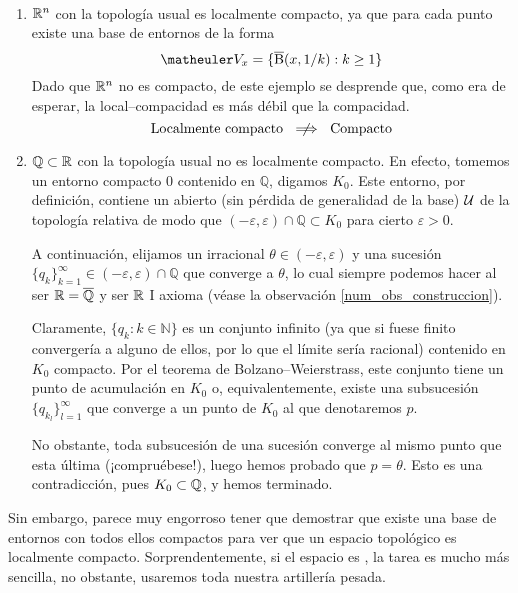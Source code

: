 \begin{exa}\
	\begin{enumerate}
		\item $\mathbb{R}^n$ con la topología usual es localmente compacto, ya que para cada punto existe una base de entornos de la forma
		\[\Va{x}=\{\adher{\bola}(x,1/k):k\geq 1\}\]
		Dado que $\mathbb{R}^n$ no es compacto, de este ejemplo se desprende que, como era de esperar, la local--compacidad es más débil que la compacidad.
		\[\text{Localmente compacto }\centernot\implies \text{ Compacto}\]
		
		\item $\mathbb{Q}\subset\mathbb{R}$ con la topología usual no es localmente compacto. En efecto, tomemos un entorno compacto $0$ contenido en $\mathbb{Q}$, digamos $K_0$. Este entorno, por definición, contiene un abierto (sin pérdida de generalidad de la base) $\mathcal{U}$ de la topología relativa de modo que $(-\varepsilon,\varepsilon)\cap \mathbb{Q}\subset K_0$ para cierto $\varepsilon>0$.
		
		A continuación, elijamos un irracional $\theta \in (-\varepsilon,\varepsilon)$ y una sucesión $\{q_k\}_{k=1}^\infty\in (-\varepsilon,\varepsilon)\cap \mathbb{Q}$ que converge a $\theta$, lo cual siempre podemos hacer al ser $\mathbb{R}=\overline{\mathbb{Q}}$ y ser $\mathbb{R}$ I axioma (véase la observación \ref{num_obs_construccion}).
		
		Claramente, $\{q_k:k\in \mathbb{N}\}$ es un conjunto infinito (ya que si fuese finito convergería a alguno de ellos, por lo que el límite sería racional) contenido en $K_0$ compacto. Por el teorema de Bolzano--Weierstrass, este conjunto tiene un punto de acumulación en $K_0$ o, equivalentemente, existe una subsucesión $\{q_{k_l}\}_{l=1}^\infty$ que converge a un punto de $K_0$ al que denotaremos $p$.
		
		No obstante, toda subsucesión de una sucesión converge al mismo punto que esta última (¡compruébese!), luego hemos probado que $p=\theta$. Esto es una contradicción, pues $K_0\subset \mathbb{Q}$, y hemos terminado.\qedhere
	\end{enumerate}
\end{exa}

Sin embargo, parece muy engorroso tener que demostrar que existe una base de entornos con todos ellos compactos para ver que un espacio topológico es localmente compacto. Sorprendentemente, si el espacio es \hausdorff, la tarea es mucho más sencilla, no obstante, usaremos toda nuestra artillería pesada.


